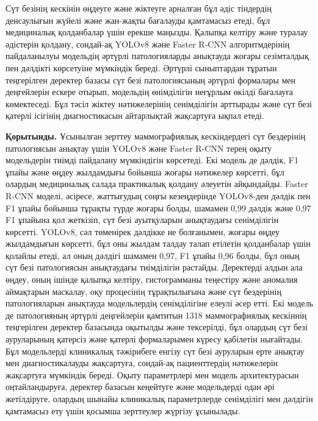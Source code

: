 \begin{multicols}{2}
Сүт безінің кескінін өңдеуге және жіктеуге арналған бұл әдіс тіндердің
денсаулығын жүйелі және жан-жақты бағалауды қамтамасыз етеді, бұл
медициналық қолданбалар үшін ерекше маңызды. Қалыпқа келтіру және
туралау әдістерін қолдану, сондай-ақ YOLOv8 және Faster R-CNN
алгоритмдерінің пайдаланылуы модельдің әртүрлі патологияларды анықтауда
жоғары сезімталдық пен дәлдікті көрсетуіне мүмкіндік береді. Әртүрлі
сыныптардан тұратын теңгерілген деректер базасы сүт безі патологиясының
әртүрлі формалары мен деңгейлерін ескере отырып, модельдің өнімділігін
неғұрлым өкілді бағалауға көмектеседі. Бұл тәсіл жіктеу нәтижелерінің
сенімділігін арттырады және сүт безі қатерлі ісігінің диагностикасын
айтарлықтай жақсартуға ықпал етеді.

{\bfseries Қорытынды.} Ұсынылған зерттеу маммографиялық кескіндердегі сүт
бездерінің патологиясын анықтау үшін YOLOv8 және Faster R-CNN терең
оқыту модельдерін тиімді пайдалану мүмкіндігін көрсетеді. Екі модель де
дәлдік, F1 ұпайы және өңдеу жылдамдығы бойынша жоғары нәтижелер
көрсетті, бұл олардың медициналық салада практикалық қолдану әлеуетін
айқындайды. Faster R-CNN моделі, әсіресе, жаттығудың соңғы кезеңдерінде
YOLOv8-ден дәлдік пен F1 ұпайы бойынша тұрақты түрде жоғары болды,
шамамен 0,99 дәлдік және 0,97 F1 ұпайына қол жеткізіп, сүт безі
ауытқуларын анықтаудағы сенімділігін көрсетті. YOLOv8, сәл төменірек
дәлдікке ие болғанымен, жоғары өңдеу жылдамдығын көрсетті, бұл оны
жылдам талдау талап етілетін қолданбалар үшін қолайлы етеді, ал оның
дәлдігі шамамен 0,97, F1 ұпайы 0,96 болды, бұл оның сүт безі
патологиясын анықтаудағы тиімділігін растайды. Деректерді алдын ала
өңдеу, оның ішінде қалыпқа келтіру, гистограмманы теңестіру және
аномалия аймақтарын маскалау, оқу процесінің тұрақтылығына және сүт
бездерінің патологияларын анықтауда модельлердің сенімділігіне елеулі
әсер етті. Екі модель де патологияның әртүрлі деңгейлерін қамтитын 1318
маммографиялық кескіннің теңгерілген деректер базасында оқытылды және
тексерілді, бұл олардың сүт безі ауруларының қатерсіз және қатерлі
формаларымен күресу қабілетін нығайтады. Бұл модельлерді клиникалық
тәжірибеге енгізу сүт безі ауруларын ерте анықтау мен диагностикалауды
жақсартуға, сондай-ақ пациенттердің нәтижелерін жақсартуға мүмкіндік
береді. Оқыту параметрлері мен модель архитектурасын оңтайландыруға,
деректер базасын кеңейтуге және модельдерді одан әрі жетілдіруге,
олардың шынайы клиникалық параметрлерде сенімділігі мен дәлдігін
қамтамасыз ету үшін қосымша зерттеулер жүргізу ұсынылады.
\end{multicols}


